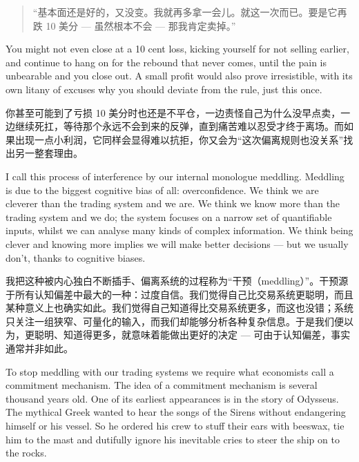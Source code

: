 \begin{quote}
\begingroup\color{\chinesebodycolorname}“基本面还是好的，又没变。我就再多拿一会儿。就这一次而已。要是它再跌 10 美分 --- 虽然根本不会 --- 那我肯定卖掉。”\endgroup
\end{quote}

\begin{englishblock} You might not even close at a 10 cent loss, kicking yourself for not selling earlier, and continue to hang on for the rebound that never comes, until the pain is unbearable and you close out. A small profit would also prove irresistible, with its own litany of excuses why you should deviate from the rule, just this once. \end{englishblock}

\begin{chineseblock}你甚至可能到了亏损 10 美分时也还是不平仓，一边责怪自己为什么没早点卖，一边继续死扛，等待那个永远不会到来的反弹，直到痛苦难以忍受才终于离场。而如果出现一点小利润，它同样会显得难以抗拒，你又会为“这次偏离规则也没关系”找出另一整套理由。\end{chineseblock}

\bipairgap

\begin{englishblock} I call this process of interference by our internal monologue meddling. Meddling is due to the biggest cognitive bias of all: overconfidence. We think we are cleverer than the trading system and we are. We think we know more than the trading system and we do; the system focuses on a narrow set of quantifiable inputs, whilst we can analyse many kinds of complex information. We think being clever and knowing more implies we will make better decisions --- but we usually don't, thanks to cognitive biases. \end{englishblock}

\begin{chineseblock}我把这种被内心独白不断插手、偏离系统的过程称为“干预（meddling）”。干预源于所有认知偏差中最大的一种：过度自信。我们觉得自己比交易系统更聪明，而且某种意义上也确实如此。我们觉得自己知道得比交易系统更多，而这也没错；系统只关注一组狭窄、可量化的输入，而我们却能够分析各种复杂信息。于是我们便以为，更聪明、知道得更多，就意味着能做出更好的决定 --- 可由于认知偏差，事实通常并非如此。\end{chineseblock}

\bipairgap

\begin{englishblock} To stop meddling with our trading systems we require what economists call a commitment mechanism. The idea of a commitment mechanism is several thousand years old. One of its earliest appearances is in the story of Odysseus. The mythical Greek wanted to hear the songs of the Sirens without endangering himself or his vessel. So he ordered his crew to stuff their ears with beeswax, tie him to the mast and dutifully ignore his inevitable cries to steer the ship on to the rocks. \end{englishblock}

